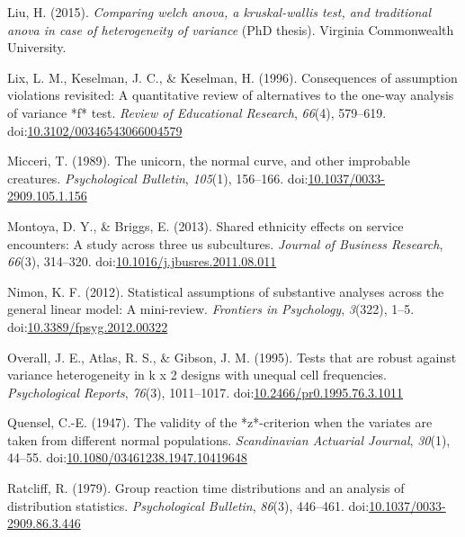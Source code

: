 \documentclass[man,floatsintext]{apa6}
\begin{document}
\leavevmode\hypertarget{ref-Liu_2015}{}%
Liu, H. (2015). \emph{Comparing welch anova, a kruskal-wallis test, and traditional anova in case of heterogeneity of variance} (PhD thesis). Virginia Commonwealth University.

\leavevmode\hypertarget{ref-Lix_Keselman_Keselman_1996}{}%
Lix, L. M., Keselman, J. C., \& Keselman, H. (1996). Consequences of assumption violations revisited: A quantitative review of alternatives to the one-way analysis of variance *f* test. \emph{Review of Educational Research}, \emph{66}(4), 579--619. doi:\href{https://doi.org/10.3102/00346543066004579}{10.3102/00346543066004579}

\leavevmode\hypertarget{ref-Micceri_1989}{}%
Micceri, T. (1989). The unicorn, the normal curve, and other improbable creatures. \emph{Psychological Bulletin}, \emph{105}(1), 156--166. doi:\href{https://doi.org/10.1037/0033-2909.105.1.156}{10.1037/0033-2909.105.1.156}

\leavevmode\hypertarget{ref-Montoya_Briggs_2013}{}%
Montoya, D. Y., \& Briggs, E. (2013). Shared ethnicity effects on service encounters: A study across three us subcultures. \emph{Journal of Business Research}, \emph{66}(3), 314--320. doi:\href{https://doi.org/10.1016/j.jbusres.2011.08.011}{10.1016/j.jbusres.2011.08.011}

\leavevmode\hypertarget{ref-Nimon_2012}{}%
Nimon, K. F. (2012). Statistical assumptions of substantive analyses across the general linear model: A mini-review. \emph{Frontiers in Psychology}, \emph{3}(322), 1--5. doi:\href{https://doi.org/10.3389/fpsyg.2012.00322}{10.3389/fpsyg.2012.00322}

\leavevmode\hypertarget{ref-Overall_et_al_1995}{}%
Overall, J. E., Atlas, R. S., \& Gibson, J. M. (1995). Tests that are robust against variance heterogeneity in k x 2 designs with unequal cell frequencies. \emph{Psychological Reports}, \emph{76}(3), 1011--1017. doi:\href{https://doi.org/10.2466/pr0.1995.76.3.1011}{10.2466/pr0.1995.76.3.1011}

\leavevmode\hypertarget{ref-Quensel_1947}{}%
Quensel, C.-E. (1947). The validity of the *z*-criterion when the variates are taken from different normal populations. \emph{Scandinavian Actuarial Journal}, \emph{30}(1), 44--55. doi:\href{https://doi.org/10.1080/03461238.1947.10419648}{10.1080/03461238.1947.10419648}

\leavevmode\hypertarget{ref-Ratcliff_1979}{}%
Ratcliff, R. (1979). Group reaction time distributions and an analysis of distribution statistics. \emph{Psychological Bulletin}, \emph{86}(3), 446--461. doi:\href{https://doi.org/10.1037/0033-2909.86.3.446}{10.1037/0033-2909.86.3.446}
\end{document}
